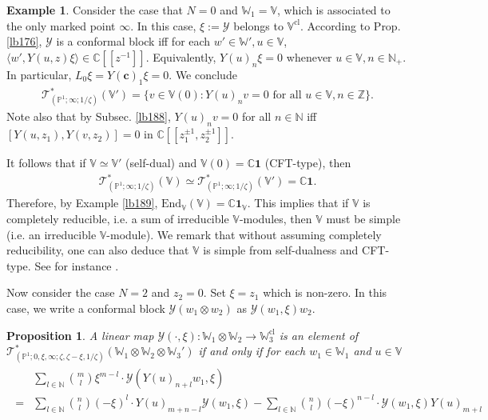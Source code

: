 \documentclass[12pt,a4paper,notitlepage]{article}
\theoremstyle{definition}
\newtheorem{eg}[df]{Example}
\theoremstyle{plain}
\newtheorem{pp}[df]{Proposition}
\newcommand{\mc}{\mathcal}
\newcommand{\End}{\mathrm{End}} %
\newcommand{\id}{\mathbf{1}}
\newcommand{\bk}[1]{\langle {#1}\rangle}
\newcommand{\scr}{\mathscr}
\newcommand{\Vbb}{\mathbb V}
\newcommand{\Wbb}{\mathbb W}
\newcommand{\Cbb}{\mathbb C}
\newcommand{\Nbb}{\mathbb N}
\newcommand{\Zbb}{\mathbb Z}
\newcommand{\Pbb}{\mathbb P}
\newcommand{\cbf}{\mathbf c}
\newcommand{\cl}{\mathrm{cl}}
\numberwithin{equation}{section}
\begin{document}
\begin{eg}
Consider the case that $N=0$ and  $\Wbb_1=\Vbb$, which is associated to the only marked point $\infty$. In this case, $\xi:=\mc Y$ belongs to $\Vbb^\cl$. According to Prop. \ref{lb176}, $\mc Y$ is a conformal block iff for each $w'\in\Wbb',u\in\Vbb$, $\bk{w',Y(u,z) \xi}\in\Cbb[[z^{-1}]]$. Equivalently, $Y(u)_n\xi=0$ whenever $u\in\Vbb,n\in\Nbb_+$. In particular,  $L_0\xi=Y(\cbf)_1\xi=0$. We conclude
\begin{align}
\scr T_{(\Pbb^1;\infty;1/\zeta)}^*(\Vbb')=\{v\in\Vbb(0):Y(u)_nv=0\text{ for all }u\in\Vbb,n\in\Zbb\}.
\end{align}
Note also that by Subsec. \ref{lb188}, $Y(u)_nv=0$ for all $n\in\Nbb$ iff $[Y(u,z_1),Y(v,z_2)]=0$ in $\Cbb[[z_1^{\pm1},z_2^{\pm1}]]$. 

It follows that if $\Vbb\simeq\Vbb'$ (self-dual) and $\Vbb(0)=\Cbb\id$ (CFT-type), then
\begin{align}
\scr T_{(\Pbb^1;\infty;1/\zeta)}^*(\Vbb)\simeq\scr T_{(\Pbb^1;\infty;1/\zeta)}^*(\Vbb')=\Cbb\id.
\end{align}
Therefore, by Example \ref{lb189}, $\End_\Vbb(\Vbb)=\Cbb\id_\Vbb$. This implies that if $\Vbb$ is completely reducible, i.e. a sum of irreducible $\Vbb$-modules, then $\Vbb$ must be simple (i.e. an irreducible $\Vbb$-module). We remark that without assuming completely reducibility, one can also deduce that $\Vbb$ is simple from self-dualness and CFT-type. See for instance \cite[Prop. 4.6]{CKLW18}.\hfill\qedsymbol
\end{eg}






Now consider the case $N=2$ and $z_2=0$. Set $\xi=z_1$ which is non-zero. In this case, we write a conformal block $\mc Y(w_1\otimes w_2)$ as $\mc Y(w_1,\xi)w_2$.

\begin{pp}
A linear map $\mc Y(\cdot,\xi):\Wbb_1\otimes\Wbb_2\rightarrow\Wbb_3^\cl$ is an element of $\scr T_{(\Pbb^1;0,\xi,\infty;\zeta,\zeta-\xi,1/\zeta)}^*(\Wbb_1\otimes\Wbb_2\otimes\Wbb_3')$ if and only if for each $w_1\in\Wbb_1$ and $u\in\Vbb$
\begin{align}\label{eq257}
\begin{aligned}
&\sum_{l\in\Nbb}{m\choose l}\xi^{m-l}\cdot \mc Y(Y(u)_{n+l}w_1,\xi)\\
=&\sum_{l\in\Nbb}{n\choose l}(-\xi)^l\cdot Y(u)_{m+n-l}\mc Y(w_1,\xi)-\sum_{l\in\Nbb}{n\choose l}(-\xi)^{n-l}\cdot\mc Y(w_1,\xi)Y(u)_{m+l}
\end{aligned}
\end{align}
\end{pp}
\end{document}
